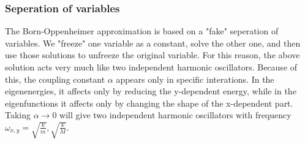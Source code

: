 \documentclass{article}
\begin{document}
\subsubsection{Seperation of variables}
The Born-Oppenheimer approximation is based on a "fake" seperation of variables. We "freeze" one variable as a constant, solve the other one, and then use those solutions to unfreeze the original variable. For this reason, the above solution acts very much like two independent harmonic oscillators. Because of this, the coupling constant $\alpha$ appears only in specific interations. In the eigenenergies, it affects only by reducing the y-dependent energy, while in the eigenfunctions it affects only by changing the shape of the x-dependent part.
\newline
Taking $\alpha \rightarrow 0$ will give two independent harmonic oscillators with frequency $\omega_{x,y} = \sqrt{\frac{k}{m}}, \sqrt{\frac{k}{M}}$.
\end{document}
